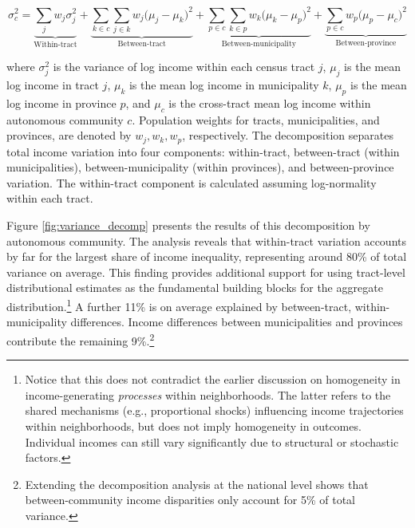 \begin{equation}\label{decomp}
\sigma^2_{c} = 
\underbrace{\sum_{j} w_j \sigma^2_{j}}_{\text{Within-tract}} + 
\underbrace{\sum_{k \in c} \sum_{j \in k} w_j \big( \mu_{j} - \mu_{k} \big)^2}_{\text{Between-tract}} + 
\underbrace{\sum_{p \in c} \sum_{k \in p} w_k \big( \mu_{k} - \mu_{p} \big)^2}_{\text{Between-municipality}} + 
\underbrace{\sum_{p \in c} w_p \big( \mu_{p} - \mu_{c} \big)^2}_{\text{Between-province}}
\end{equation}

where $\sigma^2_{j}$ is the variance of log income within each census tract $j$, $\mu_j$ is the mean log income in tract $j$, $\mu_k$ is the mean log income in municipality $k$, $\mu_p$ is the mean log income in province $p$, and  $\mu_{c}$ is the cross-tract mean log income within autonomous community $c$. Population weights for tracts, municipalities, and provinces, are denoted by $w_j, w_k, w_p$, respectively. The decomposition separates total income variation into four components: within-tract, between-tract (within municipalities), between-municipality (within provinces), and between-province variation. The within-tract component is calculated assuming log-normality within each tract.

Figure \ref{fig:variance_decomp} presents the results of this decomposition by autonomous community. The analysis reveals that within-tract variation accounts by far for the largest share of income inequality, representing around 80\% of total variance on average. This finding provides additional support for using tract-level distributional estimates as the fundamental building blocks for the aggregate distribution.\footnote{Notice that this does not contradict the earlier discussion on homogeneity in income-generating \textit{processes} within neighborhoods. The latter refers to the shared mechanisms (e.g., proportional shocks) influencing income trajectories within neighborhoods, but does not imply homogeneity in outcomes. Individual incomes can still vary significantly due to structural or stochastic factors.} A further 11\% is on average explained by between-tract, within-municipality differences. Income differences between municipalities and provinces contribute the remaining 9\%.\footnote{Extending the decomposition analysis at the national level shows that between-community income disparities only account for 5\% of total variance.}


